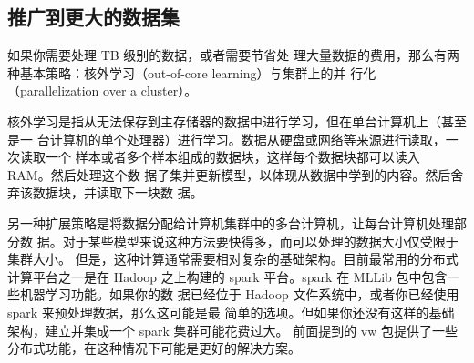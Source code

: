 \subsection{推广到更大的数据集}
如果你需要处理 TB 级别的数据，或者需要节省处
理大量数据的费用，那么有两种基本策略：核外学习（out-of-core learning）与集群上的并
行化（parallelization over a cluster）。

核外学习是指从无法保存到主存储器的数据中进行学习，但在单台计算机上（甚至是一
台计算机的单个处理器）进行学习。数据从硬盘或网络等来源进行读取，一次读取一个
样本或者多个样本组成的数据块，这样每个数据块都可以读入 RAM。然后处理这个数
据子集并更新模型，以体现从数据中学到的内容。然后舍弃该数据块，并读取下一块数
据。

另一种扩展策略是将数据分配给计算机集群中的多台计算机，让每台计算机处理部分数
据。对于某些模型来说这种方法要快得多，而可以处理的数据大小仅受限于集群大小。
但是，这种计算通常需要相对复杂的基础架构。目前最常用的分布式计算平台之一是在
Hadoop 之上构建的 spark 平台。spark 在 MLLib 包中包含一些机器学习功能。如果你的数
据已经位于 Hadoop 文件系统中，或者你已经使用 spark 来预处理数据，那么这可能是最
简单的选项。但如果你还没有这样的基础架构，建立并集成一个 spark 集群可能花费过大。
前面提到的 vw 包提供了一些分布式功能，在这种情况下可能是更好的解决方案。